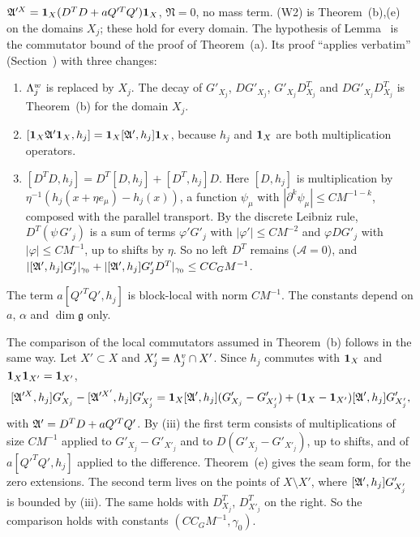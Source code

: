 \begin{detail}\label{d9:L1}
$\mathfrak A'^X=\mathbf 1_X(D^TD+aQ'^TQ')\mathbf 1_X$, $\mathfrak N=0$, no mass term. (W2) is Theorem~(b),(e) on the domains $X_j$; these hold for every domain. The hypothesis of Lemma~ is the commutator bound of the proof of Theorem~(a). Its proof ``applies verbatim'' (Section~) with three changes:
\begin{enumerate}[label=(\roman*)]
\item $\Lambda^w_j$ is replaced by $X_j$. The decay of $G'_{X_j}$, $DG'_{X_j}$, $G'_{X_j}D^T_{X_j}$ and $DG'_{X_j}D^T_{X_j}$ is Theorem~(b) for the domain $X_j$.
\item $[\mathbf 1_X\mathfrak A'\mathbf 1_X,h_j]=\mathbf 1_X[\mathfrak A',h_j]\mathbf 1_X$, because $h_j$ and $\mathbf 1_X$ are both multiplication operators.
\item $[D^TD,h_j]=D^T[D,h_j]+[D^T,h_j]D$. Here $[D,h_j]$ is multiplication by $\eta^{-1}(h_j(x+\eta e_\mu)-h_j(x))$, a function $\psi_\mu$ with $|\partial^k\psi_\mu|\le CM^{-1-k}$, composed with the parallel transport. By the discrete Leibniz rule, $D^T(\psi\,G'_j)$ is a sum of terms $\varphi'G'_j$ with $|\varphi'|\le CM^{-2}$ and $\varphi DG'_j$ with $|\varphi|\le CM^{-1}$, up to shifts by $\eta$. So no left $D^T$ remains ($\mathcal A=0$), and $|[\mathfrak A',h_j]G'_j|_{\gamma_0}+|[\mathfrak A',h_j]G'_jD^T|_{\gamma_0}\le CC_GM^{-1}$.
\end{enumerate}
The term $a[Q'^TQ',h_j]$ is block-local with norm $CM^{-1}$. The constants depend on $a$, $\alpha$ and $\dim\mathfrak g$ only.

The comparison of the local commutators assumed in Theorem~(b) follows in the same way. Let $X'\subset X$ and $X'_j=\Lambda^v_j\cap X'$. Since $h_j$ commutes with $\mathbf 1_X$ and $\mathbf 1_X\mathbf 1_{X'}=\mathbf 1_{X'}$,
\[
[\mathfrak A'^X,h_j]G'_{X_j}-[\mathfrak A'^{X'},h_j]G'_{X'_j}=\mathbf 1_X[\mathfrak A',h_j](G'_{X_j}-G'_{X'_j})+(\mathbf 1_X-\mathbf 1_{X'})[\mathfrak A',h_j]G'_{X'_j},
\]
with $\mathfrak A'=D^TD+aQ'^TQ'$. By (iii) the first term consists of multiplications of size $CM^{-1}$ applied to $G'_{X_j}-G'_{X'_j}$ and to $D(G'_{X_j}-G'_{X'_j})$, up to shifts, and of $a[Q'^TQ',h_j]$ applied to the difference. Theorem~(e) gives the seam form, for the zero extensions. The second term lives on the points of $X\setminus X'$, where $[\mathfrak A',h_j]G'_{X'_j}$ is bounded by (iii). The same holds with $D^T_{X_j}$, $D^T_{X'_j}$ on the right. So the comparison holds with constants $(CC_GM^{-1},\gamma_0)$.
\end{detail}

